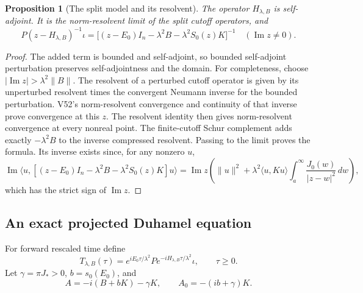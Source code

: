 \documentclass[11pt]{article}
\newtheorem{proposition}[theorem]{Proposition}
\theoremstyle{remark}
\begin{document}
\begin{proposition}[The split model and its resolvent]
\label{prop:v20v53-resolvent}
The operator \(H_{\lambda,B}\) is self-adjoint.  It is the
norm-resolvent limit of the split cutoff operators, and
\[
 P(z-H_{\lambda,B})^{-1}\iota
 =\big[(z-E_0)I_n-\lambda^2B-\lambda^2S_0(z)K\big]^{-1}
 \quad (\operatorname{Im}z\ne0).
\]
\end{proposition}
\begin{proof}
The added term is bounded and self-adjoint, so bounded
self-adjoint perturbation preserves self-adjointness and the
domain.  For completeness, choose
\(|\operatorname{Im}z|>\lambda^2\|B\|\).
The resolvent of a perturbed cutoff operator is given by its
unperturbed resolvent times the convergent Neumann inverse for
the bounded perturbation.  V52's norm-resolvent convergence and
continuity of that inverse prove convergence at this \(z\).
The resolvent identity then gives norm-resolvent convergence
at every nonreal point.  The finite-cutoff Schur complement
adds exactly \(-\lambda^2B\) to the inverse compressed
resolvent.  Passing to the limit proves the formula.
Its inverse exists since, for any nonzero \(u\),
\[
 \operatorname{Im}\langle u,
 [(z-E_0)I_n-\lambda^2B-\lambda^2S_0(z)K]u\rangle
 =\operatorname{Im}z\left(\|u\|^2+
 \lambda^2\langle u,Ku\rangle
       \int_a^\infty\frac{J_0(w)}{|z-w|^2}\,dw\right),
\]
which has the strict sign of \(\operatorname{Im}z\).
\end{proof}

\subsection{An exact projected Duhamel equation}

For forward rescaled time define
\[
 T_{\lambda,B}(\tau)=e^{iE_0\tau/\lambda^2}
           P e^{-iH_{\lambda,B}\tau/\lambda^2}\iota,\qquad \tau\geq0.
\]
Let \(\gamma=\pi J_*>0\), \(b=s_0(E_0)\), and
\[
 A=-i(B+bK)-\gamma K,\qquad A_0=-(ib+\gamma)K.
\]
\end{document}
